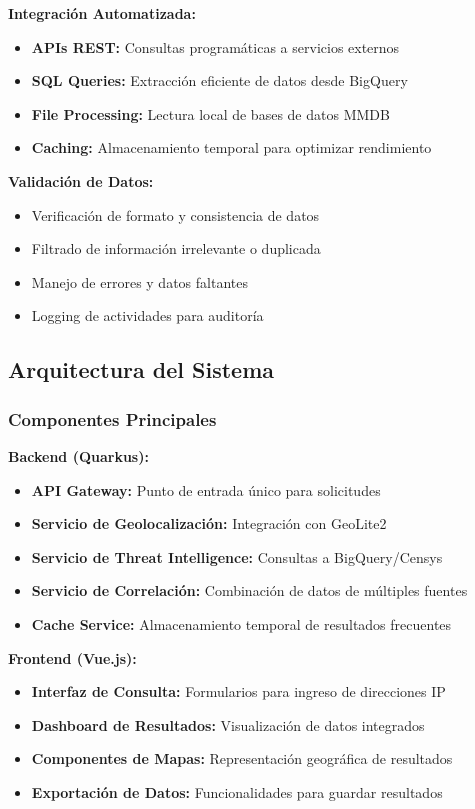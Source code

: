 \textbf{Integración Automatizada:}
\begin{itemize}
    \item \textbf{APIs REST:} Consultas programáticas a servicios externos
    \item \textbf{SQL Queries:} Extracción eficiente de datos desde BigQuery
    \item \textbf{File Processing:} Lectura local de bases de datos MMDB
    \item \textbf{Caching:} Almacenamiento temporal para optimizar rendimiento
\end{itemize}

\textbf{Validación de Datos:}
\begin{itemize}
    \item Verificación de formato y consistencia de datos
    \item Filtrado de información irrelevante o duplicada
    \item Manejo de errores y datos faltantes
    \item Logging de actividades para auditoría
\end{itemize}

\subsection{Arquitectura del Sistema}

\subsubsection{Componentes Principales}

\textbf{Backend (Quarkus):}
\begin{itemize}
    \item \textbf{API Gateway:} Punto de entrada único para solicitudes
    \item \textbf{Servicio de Geolocalización:} Integración con GeoLite2
    \item \textbf{Servicio de Threat Intelligence:} Consultas a BigQuery/Censys
    \item \textbf{Servicio de Correlación:} Combinación de datos de múltiples fuentes
    \item \textbf{Cache Service:} Almacenamiento temporal de resultados frecuentes
\end{itemize}

\textbf{Frontend (Vue.js):}
\begin{itemize}
    \item \textbf{Interfaz de Consulta:} Formularios para ingreso de direcciones IP
    \item \textbf{Dashboard de Resultados:} Visualización de datos integrados
    \item \textbf{Componentes de Mapas:} Representación geográfica de resultados
    \item \textbf{Exportación de Datos:} Funcionalidades para guardar resultados
\end{itemize}


